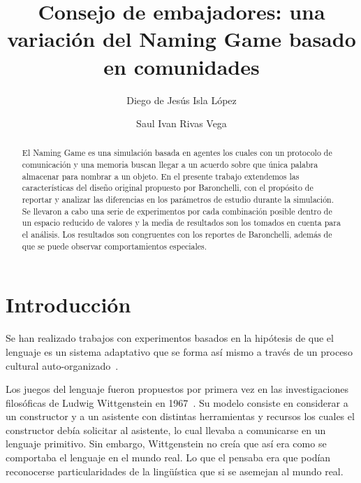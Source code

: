 \documentclass[runningheads]{llncs}
\begin{document}
%
\title{Consejo de embajadores: una variación del Naming Game basado en comunidades}
%
%
\author{Diego de Jesús Isla López \and
Saul Ivan Rivas Vega}
%
%
%
\maketitle              %
%
\begin{abstract}
El Naming Game es una simulación basada en agentes los cuales con un protocolo de comunicación y una memoria buscan llegar a un acuerdo sobre que única palabra almacenar para nombrar a un objeto. En el presente trabajo extendemos las características del diseño original propuesto por Baronchelli, con el propósito de reportar y analizar las diferencias en los parámetros de estudio durante la simulación. Se llevaron a cabo una serie de experimentos por cada combinación posible dentro de un espacio reducido de valores y la media de resultados son los tomados en cuenta para el análisis. Los resultados son congruentes con los reportes de Baronchelli, además de que se puede observar comportamientos especiales.
\end{abstract}
%
%
%
\section {Introducción}
Se han realizado trabajos con experimentos basados en la hipótesis de que el lenguaje es un sistema adaptativo que se forma así mismo a través de un proceso cultural auto-organizado~\cite{ref_article1}.

Los juegos del lenguaje fueron propuestos por primera vez en las investigaciones filosóficas de Ludwig Wittgenstein en 1967~\cite{ref_article1}. Su modelo consiste en considerar a un constructor y a un asistente con distintas herramientas y recursos los cuales el constructor debía solicitar al asistente, lo cual llevaba a comunicarse en un lenguaje primitivo. Sin embargo, Wittgenstein no creía que así era como se comportaba el lenguaje en el mundo real. Lo que el pensaba era que podían reconocerse particularidades de la lingüística que si se asemejan al mundo real.
\end{document}
